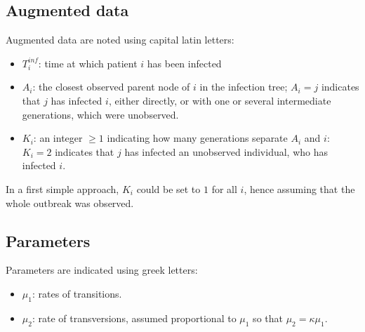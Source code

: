 \documentclass[10pt]{article}
\begin{document}
\subsection*{Augmented data}
Augmented data are noted using capital latin letters:
\begin{itemize}
	\item $T_i^{inf}$: time at which patient $i$ has been infected
	\item $A_i$: the closest observed parent node of $i$ in the infection tree; $A_i=j$ indicates that $j$ has infected $i$, either directly, or with one or several intermediate generations, which were unobserved. 
	\item $K_i$: an integer $\geq 1$ indicating how many generations separate $A_i$ and $i$: $K_i=2$ indicates that $j$ has infected an unobserved individual, who has infected $i$.
\end{itemize}

In a first simple approach, $K_i$ could be set to $1$ for all $i$, hence assuming that the whole outbreak was observed.

\subsection*{Parameters}
Parameters are indicated using greek letters:
\begin{itemize}
	\item $\mu_1$: rates of transitions.
	\item $\mu_2 $: rate of transversions, assumed proportional to $\mu_1$ so that $\mu_2 = \kappa \mu_1$.
\end{itemize}






\end{document}
